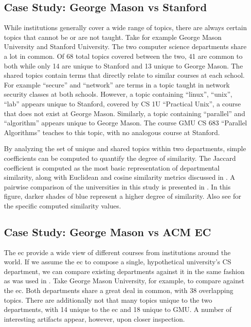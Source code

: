 \subsection{Case Study: George Mason vs Stanford}
\label{sec:eval-comparison-stanford}


While institutions generally cover a wide range of topics, there are always certain topics that cannot be or are not taught.
Take for example George Mason University and Stanford University.
The two computer science departments share a lot in common.
Of 68 total topics covered between the two, 41 are common to both while only 14 are unique to Stanford and 13 unique to George Mason.
The shared topics contain terms that directly relate to similar courses at each school.
For example ``secure'' and ``network'' are terms in a topic taught in network security classes at both schools.
However, a topic containing ``linux'', ``unix'', ``lab'' appears unique to Stanford, covered by CS 1U ``Practical Unix'', a course that does not exist at George Mason.
Similarly, a topic containing ``parallel'' and ``algorithm'' appears unique to George Mason.
The course GMU CS 683 ``Parallel Algorithms'' teaches to this topic, with no analogous course at Stanford.


By analyzing the set of unique and shared topics within two departments, simple coefficients can be computed to quantify the degree of similarity.
The Jaccard coefficient is computed as the most basic representation of departmental similarity, along with Euclidean and cosine similarity metrics discussed in .
A pairwise comparison of the universities in this study is presented in .
In this figure, darker shades of blue represent a higher degree of similarity.
Also see  for the specific computed similarity values.


\subsection{Case Study: George Mason vs ACM EC}
\label{sec:eval-comparison-acmec}


The \ac{ec} provide a wide view of different courses from institutions around the world.
If we assume the \ac{ec} to compose a single, hypothetical university's CS department, we can compare existing departments against it in the same fashion as was used in .
Take George Mason University, for example, to compare against the \ac{ec}.
Both departments share a great deal in common, with 38 overlapping topics.
There are additionally not that many topics unique to the two departments, with 14 unique to the \ac{ec} and 18 unique to GMU.
A number of interesting artifacts appear, however, upon closer inspection.

